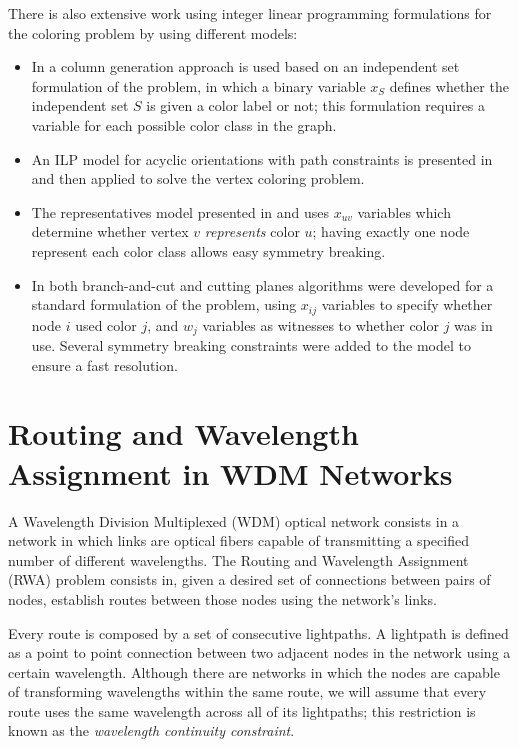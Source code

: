 There is also extensive work using integer linear programming formulations for the coloring problem by using different models:
\begin{itemize}
\item{In \cite{mehrotra1996column} a column generation approach is used based on an independent set formulation of the problem, in which a binary variable $x_S$ defines whether the independent set $S$ is given a color label or not; this formulation requires a variable for each possible color class in the graph.}
\item{An ILP model for acyclic orientations with path constraints is presented in \cite{figueiredo2005acyclic} and then applied to solve the vertex coloring problem.}
\item{The representatives model presented in \cite{campelo2004cliques} and \cite{campelo2008asymmetric} uses $x_{uv}$ variables which determine whether vertex $v$ \textit{represents} color $u$; having exactly one node represent each color class allows easy symmetry breaking.}
\item{In \cite{mendez2006branch,mendez2008cutting} both branch-and-cut and cutting planes algorithms were developed for a standard formulation of the problem, using $x_{ij}$ variables to specify whether node $i$ used color $j$, and $w_j$ variables as witnesses to whether color $j$ was in use. Several symmetry breaking constraints were added to the model to ensure a fast resolution.}
\end{itemize}

\section{Routing and Wavelength Assignment in WDM Networks}

A Wavelength Division Multiplexed (WDM) optical network consists in a network in which links are optical fibers capable of transmitting a specified number of different wavelengths. The Routing and Wavelength Assignment (RWA) problem consists in, given a desired set of connections between pairs of nodes, establish routes between those nodes using the network's links.

Every route is composed by a set of consecutive lightpaths. A lightpath is defined as a point to point connection between two adjacent nodes in the network using a certain wavelength. Although there are networks in which the nodes are capable of transforming wavelengths within the same route, we will assume that every route uses the same wavelength across all of its lightpaths; this restriction is known as the \textit{wavelength continuity constraint}.

